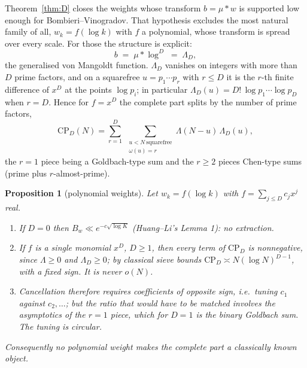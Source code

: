 \documentclass[11pt,a4paper]{article}
\theoremstyle{plain}
\newtheorem{proposition}[theorem]{Proposition}
\theoremstyle{definition}
\begin{document}
Theorem~\ref{thm:D} closes the weights whose transform $b=\mu*w$ is
supported low enough for Bombieri--Vinogradov. That hypothesis
excludes the most natural family of all, $w_k = f(\log k)$ with $f$ a
polynomial, whose transform is spread over every scale. For those the
structure is explicit:
\[
  b \;=\; \mu * \log^D \;=\; \Lambda_D,
\]
the generalised von Mangoldt function. $\Lambda_D$ vanishes on
integers with more than $D$ prime factors, and on a squarefree
$u=p_1\cdots p_r$ with $r\le D$ it is the $r$-th finite difference of
$x^D$ at the points $\log p_i$; in particular $\Lambda_D(u) =
D!\,\log p_1\cdots\log p_D$ when $r=D$. Hence for $f = x^D$ the
complete part splits by the number of prime factors,
\[
  \mathrm{CP}_D(N) = \sum_{r=1}^{D}\ \sum_{\substack{u<N\ \text{squarefree}\\ \omega(u)=r}}
   \Lambda(N-u)\,\Lambda_D(u),
\]
the $r=1$ piece being a Goldbach-type sum and the $r\ge2$ pieces
Chen-type sums (prime plus $r$-almost-prime).

\begin{proposition}[polynomial weights]\label{prop:Dpp}
Let $w_k = f(\log k)$ with $f=\sum_{j\le D}c_jx^j$ real.
\begin{enumerate}
\item[(i)] If $D=0$ then $B_w \ll e^{-c\sqrt{\log K}}$ (Huang--Li's
  Lemma 1): no extraction.
\item[(ii)] If $f$ is a single monomial $x^D$, $D\ge1$, then every
  term of $\mathrm{CP}_D$ is nonnegative, since $\Lambda\ge0$ and
  $\Lambda_D\ge0$; by classical sieve bounds
  $\mathrm{CP}_D \asymp N(\log N)^{D-1}$, with a fixed sign. It is
  never $o(N)$.
\item[(iii)] Cancellation therefore requires coefficients of opposite
  sign, i.e.\ tuning $c_1$ against $c_2,\dots$; but the ratio that
  would have to be matched involves the asymptotics of the $r=1$
  piece, which for $D=1$ \emph{is} the binary Goldbach sum. The tuning
  is circular.
\end{enumerate}
Consequently no polynomial weight makes the complete part a
classically known object.
\end{proposition}
\end{document}
